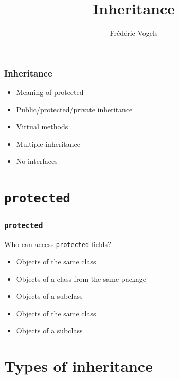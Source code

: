 

\usetikzlibrary{arrows.meta}

\title{Inheritance}
\author{Fr\'ed\'eric Vogels}

\lstset{language=c++14}




\begin{frame}
  \titlepage
\end{frame}

\begin{frame}
  \frametitle{Inheritance}
  \begin{itemize}
    \item Meaning of protected
    \item Public/protected/private inheritance
    \item Virtual methods
    \item Multiple inheritance
    \item No interfaces
  \end{itemize}
\end{frame}

\section{{\tt protected}}

\begin{frame}
  \tableofcontents[currentsection]
\end{frame}

\begin{frame}
  \frametitle{{\tt protected}}
  \begin{center}
    Who can access \texttt{protected} fields?
  \end{center}
  \begin{itemize}
    \item Objects of the same class
    \item Objects of a class from the same package
    \item Objects of a subclass
  \end{itemize}
  \vskip5mm
  \begin{itemize}
    \item Objects of the same class
    \item Objects of a subclass
  \end{itemize}
\end{frame}


\section{Types of inheritance}

